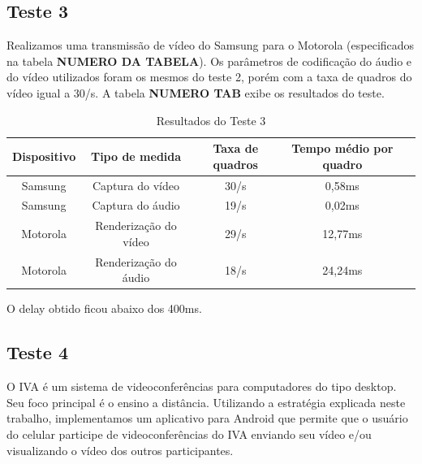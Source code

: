 \documentclass{acm_proc_article-sp}
\newcommand{\todo}[1]{\textcolor[rgb]{1.00,0.00,0.00}{\bf \uppercase{#1}}}
\begin{document}
\subsection{Teste 3}
Realizamos uma transmissão de vídeo do Samsung para o Motorola (especificados na tabela \todo{numero da tabela}). Os parâmetros de codificação do áudio e do vídeo utilizados foram os mesmos do teste 2, porém com a taxa de quadros do vídeo igual a 30/s. A tabela \todo{numero tab} exibe os resultados do teste.
\begin{table}
\centering
\caption{Resultados do Teste 3}
\begin{tabular}{|c|c|c|c|l} \hline
Dispositivo&Tipo de medida&Taxa de quadros&Tempo médio por quadro\\ \hline
Samsung&Captura do vídeo&30/s&0,58ms\\ \hline
Samsung&Captura do áudio&19/s&0,02ms\\ \hline
Motorola&Renderização do vídeo&29/s&12,77ms\\ \hline
Motorola&Renderização do áudio&18/s&24,24ms\\
\hline\end{tabular}
\end{table}
O delay obtido ficou abaixo dos 400ms.
\subsection{Teste 4}
O IVA é um sistema de videoconferências para computadores do tipo desktop. Seu foco principal é o ensino a distância. Utilizando a estratégia explicada neste trabalho, implementamos um aplicativo para Android que permite que o usuário do celular participe de videoconferências do IVA enviando seu vídeo e/ou visualizando o vídeo dos outros participantes.
\end{document}
